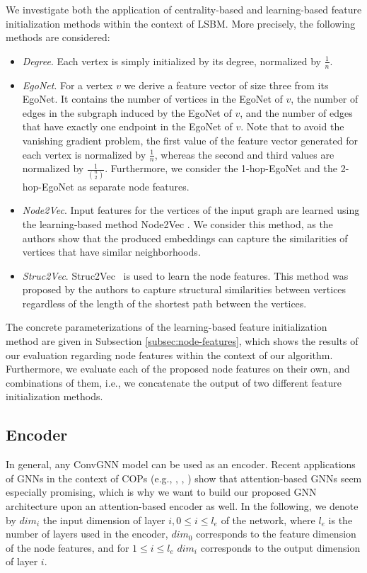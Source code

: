 \documentclass[draft,final]{vutinfth} %
\begin{document}
We investigate both the application of centrality-based and learning-based feature initialization methods within the context of LSBM. 
More precisely, the following methods are considered: 
\begin{itemize}
    \item \emph{Degree}. Each vertex is simply initialized by its degree, normalized by $\frac{1}{n}$. 
    \item \emph{EgoNet}. For a vertex $v$ we derive a feature vector of size three from its EgoNet. It contains the number of vertices in the EgoNet of $v$, the number of edges in the subgraph induced by the EgoNet of $v$, and the number of edges that have exactly one endpoint in the EgoNet of $v$. 
    Note that to avoid the vanishing gradient problem, the first value of the feature vector generated for each vertex is normalized by $\frac{1}{n}$, whereas the second and third values are normalized by $\frac{1}{\binom{n}{2}}$. 
    Furthermore, we consider the 1-hop-EgoNet and the 2-hop-EgoNet as separate node features. 
    \item \emph{Node2Vec}. Input features for the vertices of the input graph are learned using the learning-based method Node2Vec \cite{GroverL16}. We consider this method, as the authors show that the produced embeddings can capture the similarities of vertices that have similar neighborhoods. 
    \item \emph{Struc2Vec}. Struc2Vec~\cite{FigueiredoRS17} is used to learn the node features. This method was proposed by the authors to capture structural similarities between vertices regardless of the length of the shortest path between the vertices.  
\end{itemize}
The concrete parameterizations of the learning-based feature initialization method are given in Subsection \ref{subsec:node-features}, which shows the results of our evaluation regarding node features within the context of our algorithm. Furthermore, we evaluate each of the proposed node features on their own, and combinations of them, i.e., we concatenate the output of two different feature initialization methods. 

\subsection{Encoder}
In general, any ConvGNN model can be used as an encoder. Recent applications of GNNs in the context of COPs (e.g., \cite{Kool2019}, \cite{Joshi2021}, \cite{Hudson2021}) show that attention-based GNNs seem especially promising, which is why we want to build our proposed GNN architecture upon an attention-based encoder as well. 
In the following, we denote by $\mathit{dim}_i$ the input dimension of layer $i, 0 \leq i \leq l_e$ of the network, where $l_e$ is the number of layers used in the encoder, $dim_0$ corresponds to the feature dimension of the node features, and for $1 \leq i \leq l_e$ $\mathit{dim}_i$ corresponds to the output dimension of layer $i$. 
\end{document}
